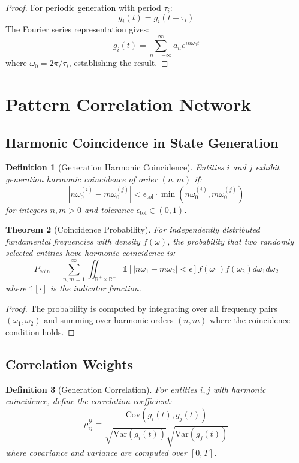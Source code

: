 \documentclass[12pt]{article}
\newtheorem{theorem}{Theorem}
\newtheorem{definition}[theorem]{Definition}
\begin{document}
\begin{proof}
For periodic generation with period $\tau_i$:
$$
g_i(t) = g_i(t + \tau_i)
$$
The Fourier series representation gives:
$$
g_i(t) = \sum_{n=-\infty}^{\infty} a_n e^{in\omega_0 t}
$$
where $\omega_0 = 2\pi/\tau_i$, establishing the result.
\end{proof}

\section{Pattern Correlation Network}

\subsection{Harmonic Coincidence in State Generation}

\begin{definition}[Generation Harmonic Coincidence]
Entities $i$ and $j$ exhibit generation harmonic coincidence of order $(n,m)$ if:
$$
\left|n\omega_0^{(i)} - m\omega_0^{(j)}\right| < \epsilon_{\text{tol}} \cdot \min(n\omega_0^{(i)}, m\omega_0^{(j)})
$$
for integers $n,m > 0$ and tolerance $\epsilon_{\text{tol}} \in (0,1)$.
\end{definition}

\begin{theorem}[Coincidence Probability]
For independently distributed fundamental frequencies with density $f(\omega)$, the probability that two randomly selected entities have harmonic coincidence is:
$$
P_{\text{coin}} = \sum_{n,m=1}^{\infty} \iint_{\mathbb{R}^+\times\mathbb{R}^+} \mathbb{1}[|n\omega_1 - m\omega_2| < \epsilon] f(\omega_1)f(\omega_2) d\omega_1 d\omega_2
$$
where $\mathbb{1}[\cdot]$ is the indicator function.
\end{theorem}

\begin{proof}
The probability is computed by integrating over all frequency pairs $(\omega_1, \omega_2)$ and summing over harmonic orders $(n,m)$ where the coincidence condition holds.
\end{proof}

\subsection{Correlation Weights}

\begin{definition}[Generation Correlation]
For entities $i,j$ with harmonic coincidence, define the correlation coefficient:
$$
\rho_{ij}^{\mathcal{G}} = \frac{\text{Cov}(g_i(t), g_j(t))}{\sqrt{\text{Var}(g_i(t))}\sqrt{\text{Var}(g_j(t))}}
$$
where covariance and variance are computed over $[0,T]$.
\end{definition}
\end{document}
